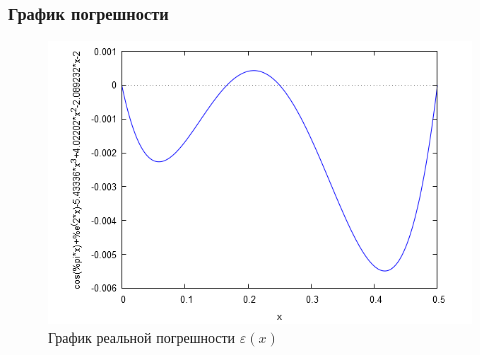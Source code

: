 \subsubsection{График погрешности}

\begin{figure}[H]
	\begin{center}
		\includegraphics[width=15cm]{newton.png}
		\caption{График реальной погрешности $\varepsilon(x)$} 
		\label{pic:1}
	\end{center}
\end{figure}


